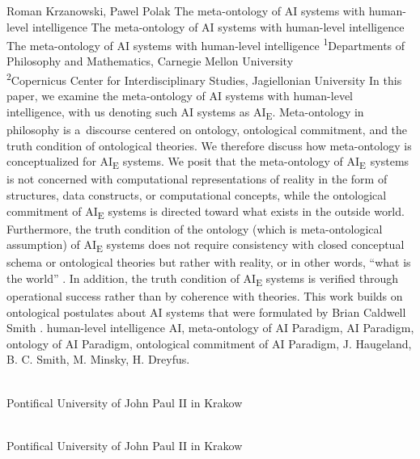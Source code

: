 \begin{artengenv2auth}{Roman Krzanowski, Pawel Polak}
	{The meta-ontology of AI systems with human-level intelligence}
	{The meta-ontology of AI systems with human-level intelligence}
	{The meta-ontology of AI systems with human-level intelligence}
	{\textsuperscript{1}Departments of Philosophy and Mathematics, Carnegie Mellon University\\
		\textsuperscript{2}Copernicus Center for Interdisciplinary Studies, Jagiellonian University}
	{In this paper, we examine the meta-ontology of AI systems with human-level intelligence, with us denoting such AI systems as AI\textsubscript{E}. Meta-ontology in philosophy is a~discourse centered on ontology, ontological commitment, and the truth condition of ontological theories. We therefore discuss how meta-ontology is conceptualized for AI\textsubscript{E} systems. We posit that the meta-ontology of AI\textsubscript{E~}systems is not concerned with computational representations of reality in the form of structures, data constructs, or computational concepts, while the ontological commitment of AI\textsubscript{E} systems is directed toward what exists in the outside world. Furthermore, the truth condition of the ontology (which is meta-ontological assumption) of AI\textsubscript{E} systems does not require consistency with closed conceptual schema or ontological theories but rather with reality, or in other words, ``what is the world''
	\parencite[][p.57]{smith_promise_2019}. %
	 In addition, the truth condition of AI\textsubscript{E} systems is verified through operational success rather than by coherence with theories. This work builds on ontological postulates about AI systems that were formulated by Brian Caldwell Smith 
	\parencite*[][]{smith_promise_2019}.%
	}
	{human-level intelligence AI, meta-ontology of AI Paradigm, AI Paradigm, ontology of AI Paradigm, ontological commitment of AI Paradigm, J. Haugeland, B. C. Smith, M. Minsky, H. Dreyfus.}
	{%
		{\flushright{}\\\subsubsectit\small{Pontifical University of John Paul II in Krakow}\par}%
		{\flushright{}\\\subsubsectit\small{Pontifical University of John Paul II in Krakow}\par}%
	}




\end{artengenv2auth}
